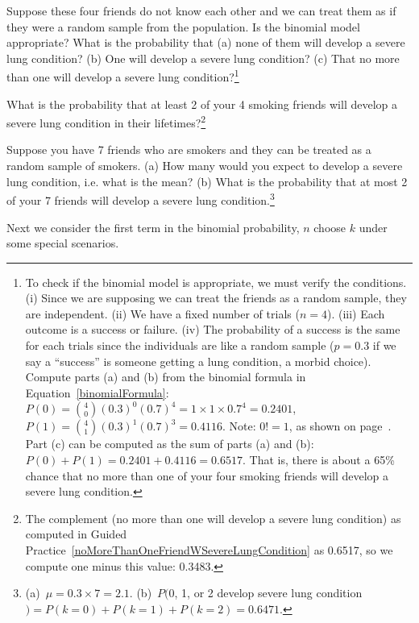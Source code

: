 \begin{exercise}
\label{noMoreThanOneFriendWSevereLungCondition}%
Suppose these four friends do not know each other and we can treat them as if they were a random sample from the population. Is the binomial model appropriate? What is the probability that (a) none of them will develop a severe lung condition? (b) One will develop a severe lung condition? (c) That no more than one will develop a severe lung condition?\footnote{To check if the binomial model is appropriate, we must verify the conditions. (i) Since we are supposing we can treat the friends as a random sample, they are independent. (ii) We have a fixed number of trials ($n=4$). (iii) Each outcome is a success or failure. (iv) The probability of a success is the same for each trials since the individuals are like a random sample ($p=0.3$ if we say a ``success'' is someone getting a lung condition, a morbid choice). Compute parts (a) and (b) from the binomial formula in Equation~\eqref{binomialFormula}: $P(0) =  {4 \choose 0} (0.3)^0 (0.7)^4 = 1\times1\times0.7^4 = 0.2401$, $P(1) = {4 \choose 1} (0.3)^1(0.7)^{3} = 0.4116$. Note: $0!=1$, as shown on page~\pageref{zeroFactorial}. Part (c) can be computed as the sum of parts (a) and (b): $P(0) + P(1) = 0.2401 + 0.4116 = 0.6517$. That is, there is about a 65\% chance that no more than one of your four smoking friends will develop a severe lung condition.}
\end{exercise}

\begin{exercise}
What is the probability that at least 2 of your 4 smoking friends will develop a severe lung condition in their lifetimes?\footnote{The complement (no more than one will develop a severe lung condition) as computed in Guided Practice~\ref{noMoreThanOneFriendWSevereLungCondition} as 0.6517, so we compute one minus this value: 0.3483.}
\end{exercise}

\begin{exercise}
Suppose you have 7 friends who are smokers and they can be treated as a random sample of smokers. (a) How many would you expect to develop a severe lung condition, i.e. what is the mean? (b) What is the probability that at most 2 of your 7 friends will develop a severe lung condition.\footnote{(a)~$\mu=0.3\times7 = 2.1$. (b)~$P($0, 1, or 2 develop severe lung condition$) = P(k=0) + P(k=1)+P(k=2) = 0.6471$.}
\end{exercise}

Next we consider the first term in the binomial probability, $n$ choose $k$ under some special scenarios.

